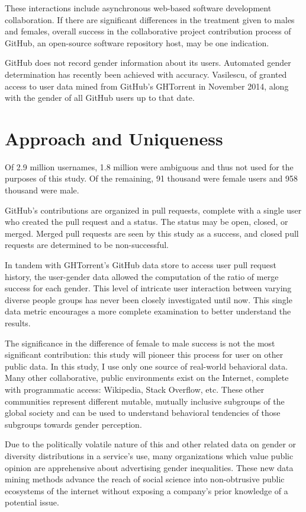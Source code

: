 \documentclass{sigplanconf}
\begin{document}
These interactions include asynchronous web-based software development
collaboration. If there are significant differences in the treatment given to males
and females, overall success in the collaborative project contribution process
of GitHub, an open-source software repository host, may be one indication.

GitHub does not record gender information about its users. Automated gender
determination has recently been achieved with accuracy. \cite{VasilescuIWC13}
Vasilescu, of \cite{VasilescuIWC13} granted access to user data mined from GitHub's GHTorrent in November 2014,
along with the gender of all GitHub users up to that date.

\section{Approach and Uniqueness}

Of 2.9 million usernames, 1.8 million were ambiguous and thus
not used for the purposes of this study. Of the remaining, 91 thousand were
female users and 958 thousand were male.

GitHub's contributions are organized in pull requests, complete with a single
user who created the pull request and a status. The status may be open, closed,
or merged. Merged pull requests are seen by this study as a success, and closed pull
requests are determined to be non-successful.

In tandem with GHTorrent's GitHub data store to
access user pull request history, the user-gender data allowed the computation of
the ratio of merge success for each gender. This level of intricate user interaction
between varying diverse people groups has never been closely investigated until
now. This single data metric encourages a more complete examination to better
understand the results.

The significance in the difference of female to male success is not the most
significant contribution: this study will pioneer this process for user on other public data.
In this study, I use only one source of real-world behavioral data.
Many other collaborative, public environments exist on the Internet, complete
with programmatic access: Wikipedia, Stack Overflow, etc. These other
communities represent different mutable, mutually inclusive subgroups of the global
society and can be used to understand behavioral tendencies of those subgroups
towards gender perception.

Due to the politically volatile nature of this and other related data on gender
or diversity distributions in a service's use, many organizations which value
public opinion are apprehensive about advertising gender inequalities. These new data
mining methods advance the reach of social science into non-obtrusive public
ecosystems of the internet without exposing a company's prior knowledge of a
potential issue.
\end{document}
